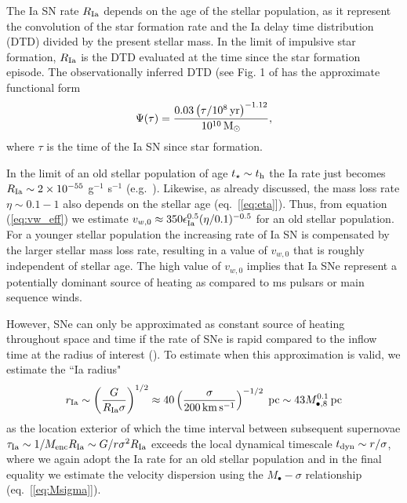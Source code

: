 \documentclass[usenatbib,fleqn]{mn2e}
\newcommand{\RateIa}{R_{\rm Ia}}
\begin{document}
The Ia SN rate $\RateIa$ depends on the age of the stellar population, as it represent the convolution of the star formation rate and the Ia delay time distribution (DTD) divided by the present stellar mass.  In the limit of impulsive star formation, $\RateIa$ is the DTD evaluated at the time since the star formation episode.  The observationally inferred DTD (see Fig. 1 of \citet{MaozMannucci+:2012a} has the approximate functional form
\begin{align}
    \Psi(\tau)=\frac{0.03
      \left(\tau/10^8\,{\rm yr}\right)^{-1.12}}{10^{10} \,{\rm M_\odot}},
  \end{align}
where $\tau$ is the time of the Ia SN since star formation.  

In the limit of an old stellar population of age $t_{\star} \sim t_{\rm h}$ the Ia rate just becomes $R_{\rm Ia} \sim 2\times 10^{-55} $ g$^{-1}$ s$^{-1}$ (e.g.~\citealt{Scannapieco&Bildsten05}).  Likewise, as already discussed, the mass loss rate $\eta \sim 0.1-1$ also depends on the stellar age (eq.~[\ref{eq:eta}]).  Thus, from equation (\ref{eq:vw_eff}) we estimate $v_{w,0} \approx 350\epsilon_{\rm Ia}^{0.5}(\eta/0.1)^{-0.5}$ for an old stellar population.  For a younger stellar population the increasing rate of Ia SN is compensated by the larger stellar mass loss rate, resulting in a value of $v_{w,0}$ that is roughly independent of stellar age.  The high value of $v_{w,0}$ implies that Ia SNe represent a potentially dominant source of heating as compared to ms pulsars or main sequence winds.  

However, SNe can only be approximated as constant source of heating throughout space and time if the rate of SNe is rapid compared to the inflow time at the radius of interest (\citealt{ShcherbakovWong+:2014a}).  To estimate when this approximation is valid, we estimate the ``Ia radius" 
\begin{eqnarray}
r_{\rm Ia} \sim \left(\frac{G}{R_{\rm Ia}\sigma}\right)^{1/2} \approx 40\left(\frac{\sigma}{200\,{\rm km\,s^{-1}}}\right)^{-1/2} \; {\rm pc} \sim 43 M_{\bullet,8}^{0.1}\,{\rm pc}
\label{eq:rIa}
\end{eqnarray}
as the location exterior of which the time interval between subsequent supernovae $\tau_{\rm Ia} \sim 1/M_{\rm enc}R_{\rm Ia} \sim G/r\sigma^{2}R_{\rm Ia}$ exceeds the local dynamical timescale $t_{\rm dyn} \sim r/\sigma$, where we again adopt the Ia rate for an old stellar population and in the final equality we estimate the velocity dispersion using the $M_{\bullet}-\sigma$ relationship (eq.~[\ref{eq:Msigma}]).
\end{document}

